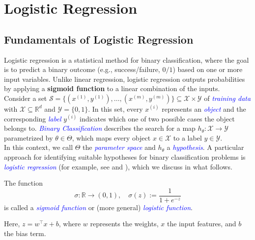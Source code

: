 \chapter{Logistic Regression}\label{chp:2}

\section{Fundamentals of Logistic Regression}
Logistic regression is a statistical method for binary classification, where the goal is to predict a binary outcome (e.g., success/failure, $0/1$) based on one or more input variables. Unlike linear regression, logistic regression outputs probabilities by applying a \textbf{sigmoid function} to a linear combination of the inputs.\\

Consider a set $\mathcal{S} = \{(x^{(1)}, y^{(1)}), \dots, (x^{(m)}, y^{(m)})\} \subseteq \mathcal{X} \times \mathcal{Y}$ of \textcolor{blue}{\emph{training data}} with $\mathcal{X} \subseteq \mathbb{R}^d$ and $\mathcal{Y}=\{0,1\}$. In this set, every $x^{(i)}$ represents an \textcolor{blue}{\emph{object}} and the corresponding \textcolor{blue}{\emph{label}} $y^{(i)}$ indicates which one of two possible cases the object belongs to. \textcolor{blue}{\emph{Binary Classification}} describes the search for a map $h_{\theta}: \mathcal{X} \rightarrow \mathcal{Y}$ parametrized by $\theta \in \Theta$, which maps every object $x \in \mathcal{X}$ to a label $y \in \mathcal{Y}$.\\

In this context, we call $\Theta$ the \textcolor{blue}{\emph{parameter space}} and $h_{\theta}$ a \textcolor{blue}{\emph{hypothesis}}. A particular approach for identifying suitable hypotheses for binary classification problems is \textcolor{blue}{\emph{logistic regression}} (for example, see \cite[chapter 4.3.2]{bishop2006pattern} and \cite[chapter 5.7.1]{goodfellow2016deep}), which we discuss in what follows.

\begin{definition}
The function
\begin{equation}
    \sigma : \mathbb{R} \to (0, 1), \quad \sigma(z) := \frac{1}{1 + e^{-z}}
    \label{eqn:1}
\end{equation}
is called a \textcolor{blue}{\emph{sigmoid function}} or (more general) \textcolor{blue}{\emph{logistic function}}.
\end{definition}

Here, $z = w^\top x + b$, where $w$ represents the weights, $x$ the input features, and $b$ the bias term.\\

